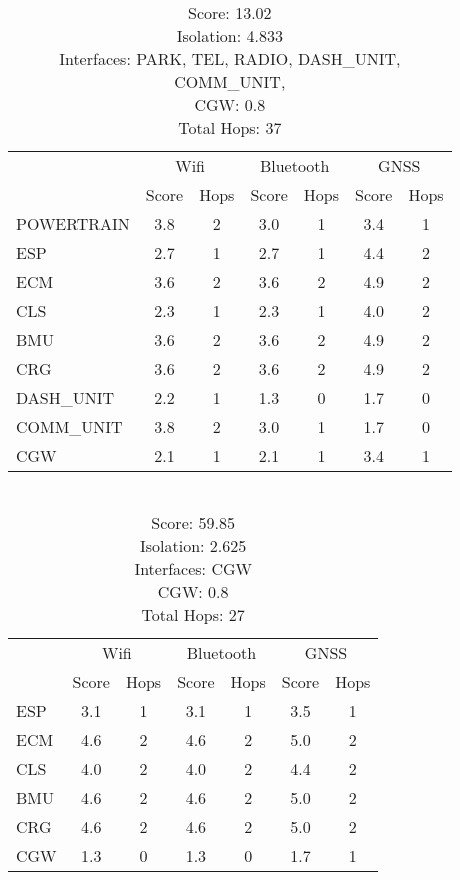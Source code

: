 \newpage

\begin{table}[ht]
    \centering
    \caption{ \\ Score: 13.02 \\ Isolation: 4.833 \\ Interfaces: PARK, TEL, RADIO, DASH\_UNIT, COMM\_UNIT, \\ CGW: 0.8 \\ Total Hops: 37}
    \label{tab:arch7}
    \begin{tabular}{lcccccc}
    \hline
        & \multicolumn{2}{c}{Wifi} & \multicolumn{2}{c}{Bluetooth} & \multicolumn{2}{c}{GNSS} \\
        & Score & Hops & Score & Hops & Score & Hops \\
    \hline
    POWERTRAIN & 3.8 & 2 & 3.0 & 1 & 3.4 & 1 \\
    ESP & 2.7 & 1 & 2.7 & 1 & 4.4 & 2 \\
    ECM & 3.6 & 2 & 3.6 & 2 & 4.9 & 2 \\
    CLS & 2.3 & 1 & 2.3 & 1 & 4.0 & 2 \\
    BMU & 3.6 & 2 & 3.6 & 2 & 4.9 & 2 \\
    CRG & 3.6 & 2 & 3.6 & 2 & 4.9 & 2 \\
    DASH\_UNIT & 2.2 & 1 & 1.3 & 0 & 1.7 & 0 \\
    COMM\_UNIT & 3.8 & 2 & 3.0 & 1 & 1.7 & 0 \\
    CGW & 2.1 & 1 & 2.1 & 1 & 3.4 & 1 \\
    \hline
    \end{tabular}
\end{table}  


\begin{table}[ht]
    \centering
    \caption{ \\ Score: 59.85 \\ Isolation: 2.625 \\ Interfaces: CGW \\ CGW: 0.8 \\ Total Hops: 27}
    \label{tab:arch8}
    \begin{tabular}{lcccccc}
    \hline
        & \multicolumn{2}{c}{Wifi} & \multicolumn{2}{c}{Bluetooth} & \multicolumn{2}{c}{GNSS} \\
        & Score & Hops & Score & Hops & Score & Hops \\
    \hline
    ESP & 3.1 & 1 & 3.1 & 1 & 3.5 & 1 \\
    ECM & 4.6 & 2 & 4.6 & 2 & 5.0 & 2 \\
    CLS & 4.0 & 2 & 4.0 & 2 & 4.4 & 2 \\
    BMU & 4.6 & 2 & 4.6 & 2 & 5.0 & 2 \\
    CRG & 4.6 & 2 & 4.6 & 2 & 5.0 & 2 \\
    CGW & 1.3 & 0 & 1.3 & 0 & 1.7 & 1 \\
    \hline
    \end{tabular}
\end{table}

